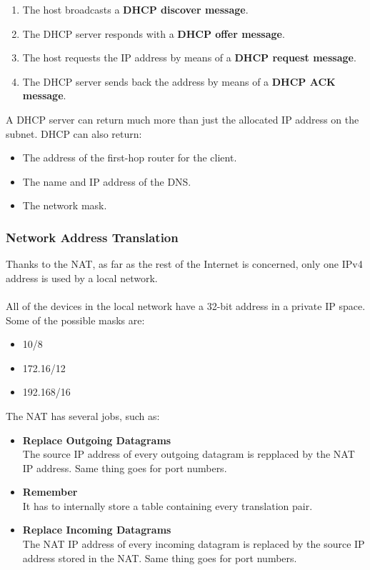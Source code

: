 \documentclass{article}
\begin{document}
\begin{enumerate}
	\item The host broadcasts a \textbf{DHCP discover message}.
	\item The DHCP server responds with a \textbf{DHCP offer message}.
	\item The host requests the IP address by means of a \textbf{DHCP request message}.
	\item The DHCP server sends back the address by means of a \textbf{DHCP ACK message}.
\end{enumerate}
A DHCP server can return much more than just the allocated IP address on the subnet. DHCP can also return:

\begin{itemize}
	\item The address of the first-hop router for the client.
	\item The name and IP address of the DNS.
	\item The network mask.
\end{itemize}

\subsubsection{Network Address Translation}
Thanks to the NAT, as far as the rest of the Internet is concerned, only one IPv4 address is used by a local network. \\ \\
All of the devices in the local network have a 32-bit address in a private IP space. Some of the possible masks are:

\begin{itemize}
	\item 10/8
	\item 172.16/12
	\item 192.168/16
\end{itemize}
The NAT has several jobs, such as:

\begin{itemize}
	\item \textbf{Replace Outgoing Datagrams}
	\vspace{.2cm} \\
	The source IP address of every outgoing datagram is repplaced by the NAT IP address. Same thing goes for port numbers.
	
	\item \textbf{Remember}
	\vspace{.2cm} \\
	It has to internally store a table containing every translation pair.
	
	\item \textbf{Replace Incoming Datagrams}
	\vspace{.2cm} \\
	The NAT IP address of every incoming datagram is replaced by the source IP address stored in the NAT. Same thing goes for port numbers.
\end{itemize}
\end{document}
